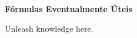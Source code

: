 \begin{center}
	{\Large \textbf{Fórmulas Eventualmente Úteis}}
\end{center}

\begin{center}
	Unleash knowledge here.
\end{center}
\vspace{10mm}


